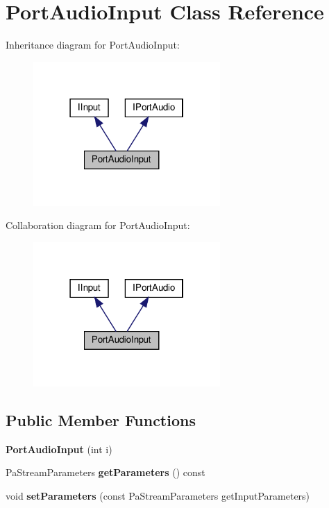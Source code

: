 \hypertarget{class_port_audio_input}{}\section{Port\+Audio\+Input Class Reference}
\label{class_port_audio_input}


Inheritance diagram for Port\+Audio\+Input\+:
\nopagebreak
\begin{figure}[H]
\begin{center}
\leavevmode
\includegraphics[width=202pt]{class_port_audio_input__inherit__graph}
\end{center}
\end{figure}


Collaboration diagram for Port\+Audio\+Input\+:
\nopagebreak
\begin{figure}[H]
\begin{center}
\leavevmode
\includegraphics[width=202pt]{class_port_audio_input__coll__graph}
\end{center}
\end{figure}
\subsection*{Public Member Functions}
\begin{DoxyCompactItemize}
\item 
\mbox{\label{class_port_audio_input_a178d6babb3762d1e4d1d61bd41c976ae}} 
{\bfseries Port\+Audio\+Input} (int i)
\item 
\mbox{\label{class_port_audio_input_a8bfa09888eae1a4ba66b834ca60889f7}} 
Pa\+Stream\+Parameters {\bfseries get\+Parameters} () const
\item 
\mbox{\label{class_port_audio_input_a137f30910ee1a1c264ff066dce1bf821}} 
void {\bfseries set\+Parameters} (const Pa\+Stream\+Parameters get\+Input\+Parameters)
\end{DoxyCompactItemize}



